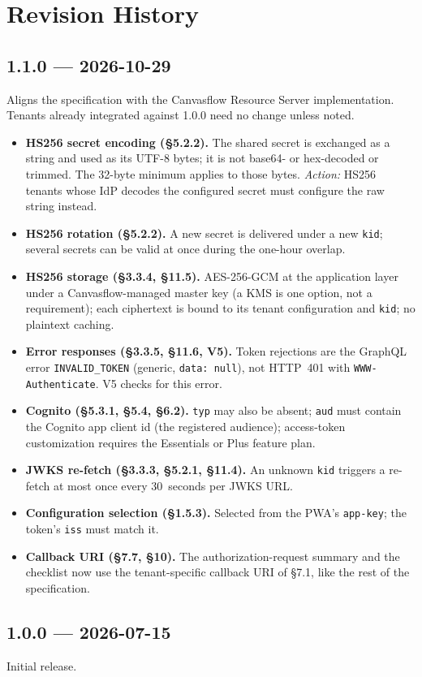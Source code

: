 \section{Revision History}\label{sec:revision-history}

\subsection{1.1.0 --- 2026-10-29}

Aligns the specification with the Canvasflow Resource Server implementation. Tenants
already integrated against 1.0.0 need no change unless noted.

\begin{itemize}
  \item \textbf{HS256 secret encoding (\S5.2.2).} The shared secret is exchanged as a
    string and used as its UTF-8 bytes; it is not base64- or hex-decoded or trimmed. The
    32-byte minimum applies to those bytes. \emph{Action:} HS256 tenants whose IdP
    decodes the configured secret must configure the raw string instead.
  \item \textbf{HS256 rotation (\S5.2.2).} A new secret is delivered under a new
    \texttt{kid}; several secrets can be valid at once during the one-hour overlap.
  \item \textbf{HS256 storage (\S3.3.4, \S11.5).} AES-256-GCM at the application layer
    under a Canvasflow-managed master key (a KMS is one option, not a requirement); each
    ciphertext is bound to its tenant configuration and \texttt{kid}; no plaintext
    caching.
  \item \textbf{Error responses (\S3.3.5, \S11.6, V5).} Token rejections are the GraphQL
    error \texttt{INVALID\_TOKEN} (generic, \texttt{data: null}), not HTTP~401 with
    \texttt{WWW-Authenticate}. V5 checks for this error.
  \item \textbf{Cognito (\S5.3.1, \S5.4, \S6.2).} \texttt{typ} may also be absent;
    \texttt{aud} must contain the Cognito app client id (the registered audience);
    access-token customization requires the Essentials or Plus feature plan.
  \item \textbf{JWKS re-fetch (\S3.3.3, \S5.2.1, \S11.4).} An unknown \texttt{kid}
    triggers a re-fetch at most once every 30~seconds per JWKS URL.
  \item \textbf{Configuration selection (\S1.5.3).} Selected from the PWA's
    \texttt{app-key}; the token's \texttt{iss} must match it.
  \item \textbf{Callback URI (\S7.7, \S10).} The authorization-request summary and the
    checklist now use the tenant-specific callback URI of \S7.1, like the rest of the
    specification.
\end{itemize}

\subsection{1.0.0 --- 2026-07-15}

Initial release.
